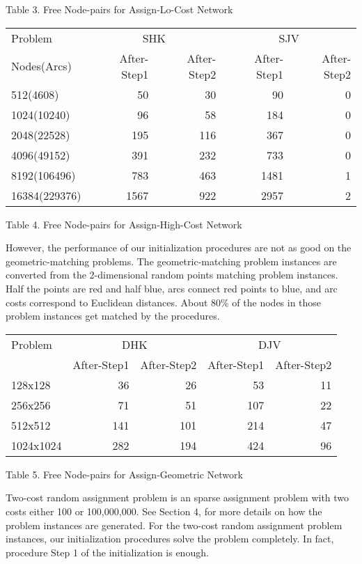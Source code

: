 \vskip 2pt
{Table 3. Free Node-pairs for Assign-Lo-Cost Network}
\vskip 5pt

\vskip 5pt
{\small
\begin{tabular}{|l|rr|rr|} \hline
 Problem & \multicolumn{2}{c|}{SHK}& \multicolumn{2}{c|}{SJV}\\
Nodes(Arcs)&After-Step1 &After-Step2 &After-Step1 &After-Step2\\ \hline
512(4608)& 50& 30& 90& 0\\ 
1024(10240)& 96& 58& 184& 0\\ 
2048(22528)& 195& 116& 367& 0\\ 
4096(49152)& 391& 232& 733& 0\\ 
8192(106496)& 783& 463& 1481& 1\\ 
16384(229376)& 1567& 922& 2957& 2\\ \hline
\end{tabular}
}

\vskip 2pt
{Table 4. Free Node-pairs for Assign-High-Cost Network}
\vskip 5pt

However, the performance of our initialization procedures are 
not as good on the geometric-matching problems.
The geometric-matching problem instances are converted from the 2-dimensional
random points matching problem instances. 
Half the points are red and half blue, arcs 
connect red points to blue, and arc costs correspond to Euclidean
distances.
About 80\% of the nodes in those problem instances
get matched by the procedures.

\vskip 5pt
{\small
\begin{tabular}{|l|rr|rr|} \hline
 Problem & \multicolumn{2}{c|}{DHK}& \multicolumn{2}{c|}{DJV}\\
&After-Step1 &After-Step2 &After-Step1 &After-Step2\\ \hline
128x128& 36& 26& 53& 11\\ 
256x256& 71& 51& 107& 22\\ 
512x512& 141& 101& 214& 47\\ 
1024x1024& 282& 194& 424& 96\\ \hline
\end{tabular}
}

\vskip 2pt
{Table 5. Free Node-pairs for Assign-Geometric Network}
\vskip 5pt

Two-cost random assignment problem is an sparse assignment
problem with two costs either 100 or 100,000,000. See Section 4,
for more details on how the problem instances are generated.
For the two-cost random assignment problem instances, our initialization
procedures solve the problem completely. In fact, procedure Step 1 of the 
initialization is enough.

